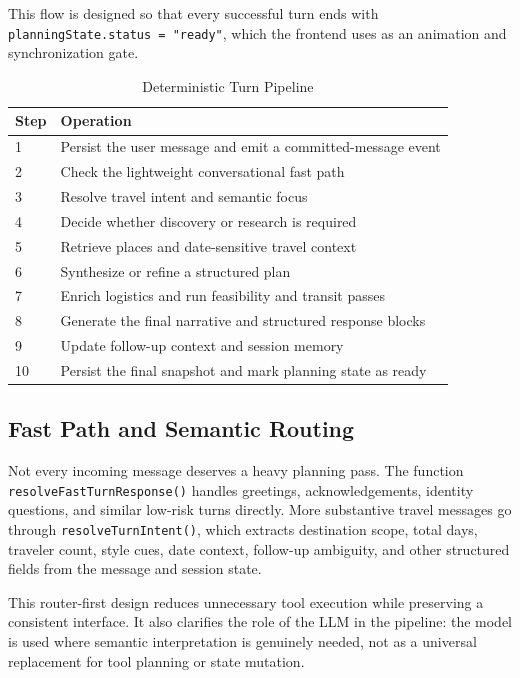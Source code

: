 \documentclass[conference]{IEEEtran}
\begin{document}
This flow is designed so that every successful turn ends with \texttt{planningState.status = "ready"}, which the frontend uses as an animation and synchronization gate.

\begin{table}[htbp]
\caption{Deterministic Turn Pipeline}
\label{tab:turnpipeline}
\centering
\begin{tabular}{p{0.65cm} p{6.9cm}}
\toprule
\textbf{Step} & \textbf{Operation} \\
\midrule
1 & Persist the user message and emit a committed-message event \\
2 & Check the lightweight conversational fast path \\
3 & Resolve travel intent and semantic focus \\
4 & Decide whether discovery or research is required \\
5 & Retrieve places and date-sensitive travel context \\
6 & Synthesize or refine a structured plan \\
7 & Enrich logistics and run feasibility and transit passes \\
8 & Generate the final narrative and structured response blocks \\
9 & Update follow-up context and session memory \\
10 & Persist the final snapshot and mark planning state as ready \\
\bottomrule
\end{tabular}
\end{table}

\subsection{Fast Path and Semantic Routing}

Not every incoming message deserves a heavy planning pass. The function \texttt{resolveFastTurnResponse()} handles greetings, acknowledgements, identity questions, and similar low-risk turns directly. More substantive travel messages go through \texttt{resolveTurnIntent()}, which extracts destination scope, total days, traveler count, style cues, date context, follow-up ambiguity, and other structured fields from the message and session state.

This router-first design reduces unnecessary tool execution while preserving a consistent interface. It also clarifies the role of the LLM in the pipeline: the model is used where semantic interpretation is genuinely needed, not as a universal replacement for tool planning or state mutation.
\end{document}
